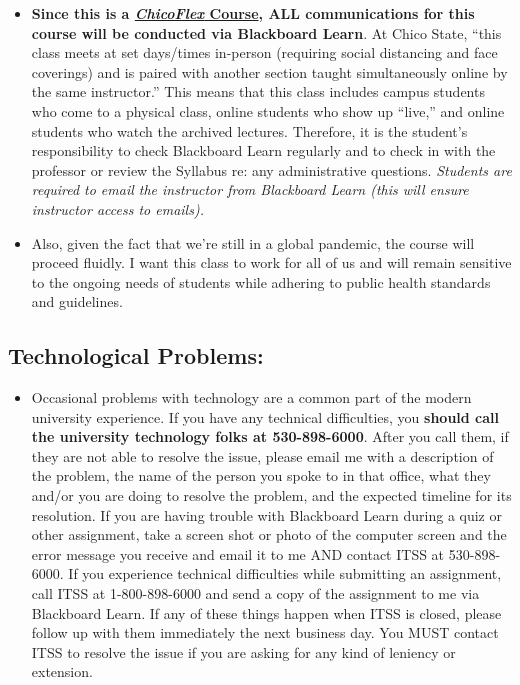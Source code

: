 \documentclass[11pt,]{article}
\providecommand{\tightlist}{%
  \setlength{\itemsep}{0pt}\setlength{\parskip}{0pt}}
\begin{document}
\begin{itemize}
\item
  \textbf{Since this is a
  \href{https://www.csuchico.edu/tlp/chicoflex/faq.shtml\#whatiscoflex}{\emph{ChicoFlex}
  Course}, ALL communications for this course will be conducted via
  Blackboard Learn}. At Chico State, ``this class meets at set
  days/times in-person (requiring social distancing and face coverings)
  and is paired with another section taught simultaneously online by the
  same instructor.'' This means that this class includes campus students
  who come to a physical class, online students who show up ``live,''
  and online students who watch the archived lectures. Therefore, it is
  the student's responsibility to check Blackboard Learn regularly and
  to check in with the professor or review the Syllabus re: any
  administrative questions. \emph{Students are required to email the
  instructor from Blackboard Learn (this will ensure instructor access
  to emails).}
\item
  Also, given the fact that we're still in a global pandemic, the course
  will proceed fluidly. I want this class to work for all of us and will
  remain sensitive to the ongoing needs of students while adhering to
  public health standards and guidelines.
\end{itemize}

\hypertarget{technological-problems}{%
\subsection{Technological Problems:}\label{technological-problems}}

\begin{itemize}
\tightlist
\item
  Occasional problems with technology are a common part of the modern
  university experience. If you have any technical difficulties, you
  \textbf{should call the university technology folks at 530-898-6000}.
  After you call them, if they are not able to resolve the issue, please
  email me with a description of the problem, the name of the person you
  spoke to in that office, what they and/or you are doing to resolve the
  problem, and the expected timeline for its resolution. If you are
  having trouble with Blackboard Learn during a quiz or other
  assignment, take a screen shot or photo of the computer screen and the
  error message you receive and email it to me AND contact ITSS at
  530-898-6000. If you experience technical difficulties while
  submitting an assignment, call ITSS at 1-800-898-6000 and send a copy
  of the assignment to me via Blackboard Learn. If any of these things
  happen when ITSS is closed, please follow up with them immediately the
  next business day. You MUST contact ITSS to resolve the issue if you
  are asking for any kind of leniency or extension.
\end{itemize}
\end{document}
